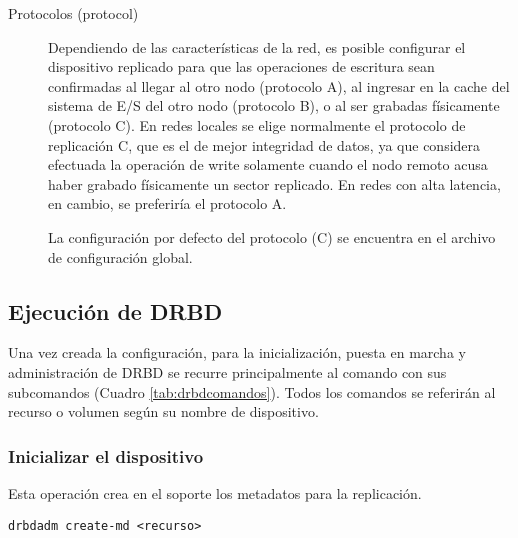 \begin{description}
\item [Protocolos (protocol)]
Dependiendo de las características de la red, es posible configurar el dispositivo replicado para que las operaciones de escritura sean confirmadas al llegar al otro nodo (protocolo A), al ingresar en la cache del sistema de E/S del otro nodo (protocolo B), o al ser grabadas físicamente (protocolo C). En redes locales se elige normalmente el protocolo de replicación C, que es el de mejor integridad de datos, ya que considera efectuada la operación de write solamente cuando el nodo remoto acusa haber grabado físicamente un sector replicado. En redes con alta latencia, en cambio, se preferiría el protocolo A.

La configuración por defecto del protocolo (C) se encuentra en el archivo de configuración global.


\end{description}


\subsection{Ejecución de DRBD}
Una vez creada la configuración, para la inicialización, puesta en marcha y administración de DRBD se recurre principalmente al comando  con sus subcomandos (Cuadro \ref{tab:drbdcomandos}). Todos los comandos se referirán al recurso o volumen según su nombre de dispositivo. 

\subsubsection{Inicializar el dispositivo}
Esta operación crea en el soporte los metadatos para la replicación. 
\begin{lstlisting}
drbdadm create-md <recurso>
\end{lstlisting}

